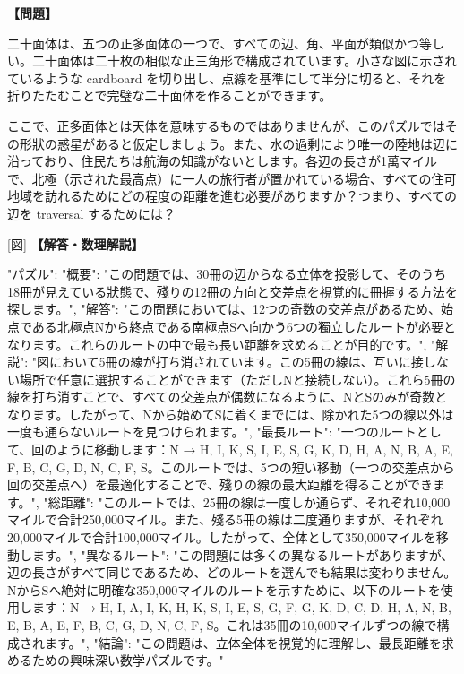 \documentclass[10pt,a4paper,oneside,openany]{ltjsbook}
\begin{document}
\begin{tcolorbox}[colback=softblue,colframe=primaryblue,title=\textbf{第 246 問：THE ICOSAHEDRON PUZZLE.},arc=2mm,boxrule=1pt,breakable]
\textbf{【問題】}\par\vspace{0.3em}
二十面体は、五つの正多面体の一つで、すべての辺、角、平面が類似かつ等しい。二十面体は二十枚の相似な正三角形で構成されています。小さな図に示されているような cardboard を切り出し、点線を基準にして半分に切ると、それを折りたたむことで完璧な二十面体を作ることができます。

ここで、正多面体とは天体を意味するものではありませんが、このパズルではその形狀の惑星があると仮定しましょう。また、水の過剰により唯一の陸地は辺に沿っており、住民たちは航海の知識がないとします。各辺の長さが1萬マイルで、北極（示された最高点）に一人の旅行者が置かれている場合、すべての住可地域を訪れるためにどの程度の距離を進む必要がありますか？つまり、すべての辺を traversal するためには？

[図]
\tcblower
\textbf{【解答・数理解説】}\par\vspace{0.3em}
{
  "パズル": {
    "概要": "この問題では、30冊の辺からなる立体を投影して、そのうち18冊が見えている狀態で、殘りの12冊の方向と交差点を視覚的に冊握する方法を探します。",
    "解答": "この問題においては、12つの奇数の交差点があるため、始点である北極点Nから終点である南極点Sへ向かう6つの獨立したルートが必要となります。これらのルートの中で最も長い距離を求めることが目的です。",
    "解説": "図において5冊の線が打ち消されています。この5冊の線は、互いに接しない場所で任意に選択することができます（ただしNと接続しない）。これら5冊の線を打ち消すことで、すべての交差点が偶数になるように、NとSのみが奇数となります。したがって、Nから始めてSに着くまでには、除かれた5つの線以外は一度も通らないルートを見つけられます。",
    "最長ルート": "一つのルートとして、回のように移動します：N → H, I, K, S, I, E, S, G, K, D, H, A, N, B, A, E, F, B, C, G, D, N, C, F, S。このルートでは、5つの短い移動（一つの交差点から回の交差点へ）を最適化することで、殘りの線の最大距離を得ることができます。",
    "総距離": "このルートでは、25冊の線は一度しか通らず、それぞれ10,000マイルで合計250,000マイル。また、殘る5冊の線は二度通りますが、それぞれ20,000マイルで合計100,000マイル。したがって、全体として350,000マイルを移動します。",
    "異なるルート": "この問題には多くの異なるルートがありますが、辺の長さがすべて同じであるため、どのルートを選んでも結果は変わりません。NからSへ絶対に明確な350,000マイルのルートを示すために、以下のルートを使用します：N → H, I, A, I, K, H, K, S, I, E, S, G, F, G, K, D, C, D, H, A, N, B, E, B, A, E, F, B, C, G, D, N, C, F, S。これは35冊の10,000マイルずつの線で構成されます。",
    "結論": "この問題は、立体全体を視覚的に理解し、最長距離を求めるための興味深い数学パズルです。"
  }
}
\end{tcolorbox}
\end{document}
